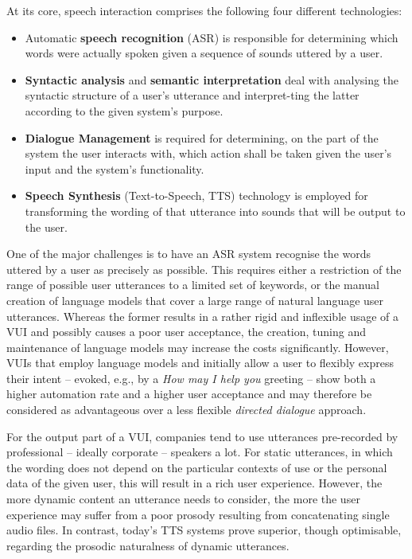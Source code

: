\begin{multicols}{2}
At its core, speech interaction comprises the following four different technologies:
\begin{itemize}
\item Automatic \textbf{speech recognition} (ASR) is responsible for determining which words were actually spoken given a sequence of sounds uttered by a user.
\item \textbf{Syntactic analysis} and \textbf{semantic interpretation} deal with analysing the syntactic structure of a user’s utterance and interpret-ting the latter according to the given system’s purpose.
\item \textbf{Dialogue Management} is required for determining, on the part of the system the user interacts with, which action shall be taken given the user’s input and the system’s functionality.
\item \textbf{Speech Synthesis} (Text-to-Speech, TTS) technology is employed for transforming the wording of that utterance into sounds that will be output to the user. 
\end{itemize}
One of the major challenges is to have an ASR system recognise the words uttered by a user as precisely as possible. This requires either a restriction of the range of possible user utterances to a limited set of keywords, or the manual creation of language models that cover a large range of natural language user utterances. Whereas the former results in a rather rigid and inflexible usage of a VUI and possibly causes a poor user acceptance, the creation, tuning and maintenance of language models may increase the costs significantly. However, VUIs that employ language models and initially allow a user to flexibly express their intent – evoked, e.g., by a \textit{How may I help you} greeting – show both a higher automation rate and a higher user acceptance and may therefore be considered as advantageous over a less flexible \textit{directed dialogue} approach.


For the output part of a VUI, companies tend to use utterances pre-recorded by professional – ideally corporate – speakers a lot. For static utterances, in which the wording does not depend on the particular contexts of use or the personal data of the given user, this will result in a rich user experience. However, the more dynamic content an utterance needs to consider, the more the user experience may suffer from a poor prosody resulting from concatenating single audio files. In contrast, today’s TTS systems prove superior, though optimisable, regarding the prosodic naturalness of dynamic utterances.  


\end{multicols}
